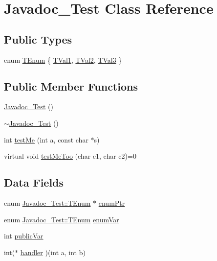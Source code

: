 \hypertarget{class_javadoc___test}{}\section{Javadoc\+\_\+\+Test Class Reference}
\label{class_javadoc___test}
\subsection*{Public Types}
\begin{DoxyCompactItemize}
\item 
enum \hyperlink{class_javadoc___test_a33e3643b66dfa91e4fb7cc663a23e166}{T\+Enum} \{ \hyperlink{class_javadoc___test_a33e3643b66dfa91e4fb7cc663a23e166ac9f4289a4feb75ac0139725819c1b157}{T\+Val1}, 
\hyperlink{class_javadoc___test_a33e3643b66dfa91e4fb7cc663a23e166ac00c479a45ce5e7084ad3f2afdfc2fb3}{T\+Val2}, 
\hyperlink{class_javadoc___test_a33e3643b66dfa91e4fb7cc663a23e166a0fdf008c61e518a16a3e9ec2cc8d2c78}{T\+Val3}
 \}
\end{DoxyCompactItemize}
\subsection*{Public Member Functions}
\begin{DoxyCompactItemize}
\item 
\hyperlink{class_javadoc___test_a7adb1076a9f698a2aa8a5ac0879f34ff}{Javadoc\+\_\+\+Test} ()
\item 
\hyperlink{class_javadoc___test_abda4d40f58e25104c7087e435fb0ddd0}{$\sim$\+Javadoc\+\_\+\+Test} ()
\item 
int \hyperlink{class_javadoc___test_af1299ea1b7efeb1548c7aba201ebe756}{test\+Me} (int a, const char $\ast$s)
\item 
virtual void \hyperlink{class_javadoc___test_afe4f857536cdccd2f160ad619a61eba3}{test\+Me\+Too} (char c1, char c2)=0
\end{DoxyCompactItemize}
\subsection*{Data Fields}
\begin{DoxyCompactItemize}
\item 
enum \hyperlink{class_javadoc___test_a33e3643b66dfa91e4fb7cc663a23e166}{Javadoc\+\_\+\+Test\+::\+T\+Enum} $\ast$ \hyperlink{class_javadoc___test_ab994283d87e01a8bbe197a9c8eac7c06}{enum\+Ptr}
\item 
enum \hyperlink{class_javadoc___test_a33e3643b66dfa91e4fb7cc663a23e166}{Javadoc\+\_\+\+Test\+::\+T\+Enum} \hyperlink{class_javadoc___test_a1e1e81400c78c4a5992888bd484d9d68}{enum\+Var}
\item 
int \hyperlink{class_javadoc___test_a292887ac25652b1d8448430f583378c3}{public\+Var}
\item 
int($\ast$ \hyperlink{class_javadoc___test_a83e6d7b763dc413e96b0c435a1d29a5d}{handler} )(int a, int b)
\end{DoxyCompactItemize}


